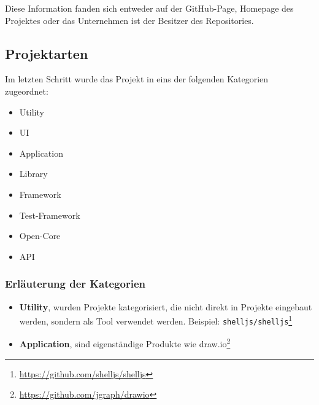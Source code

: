 \noindent
Diese Information fanden sich entweder auf der GitHub-Page, Homepage des Projektes oder das Unternehmen
ist der Besitzer des Repositories.



\newpage %
\subsection{Projektarten}
Im letzten Schritt wurde das Projekt in eins der folgenden Kategorien zugeordnet:

\begin{multicols}{2}
    \begin{itemize}
        \setlength\itemsep{0em}
        \item Utility
        \item UI
        \item Application
        \item Library
        \item Framework
        \item Test-Framework
        \item Open-Core
        \item API
    \end{itemize}
\end{multicols}

\subsubsection*{Erläuterung der Kategorien}

\begin{itemize}
    \setlength\itemsep{0em}
    \item \textbf{Utility}, wurden Projekte kategorisiert, die nicht direkt in Projekte eingebaut
          werden, sondern als Tool verwendet werden. Beispiel: \texttt{shelljs/shelljs}\footnote{
              \url{https://github.com/shelljs/shelljs}}
    \item \textbf{Application}, sind eigenständige Produkte wie draw.io\footnote{
              \url{https://github.com/jgraph/drawio}}
\end{itemize}





\newpage %

